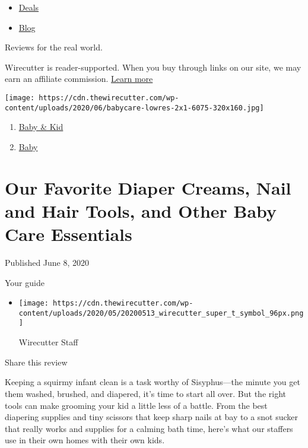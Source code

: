 \begin{itemize}
\tightlist
\item
  \href{/wirecutter/deals/}{Deals}
\item
  \href{/wirecutter/blog/}{Blog}
\end{itemize}

Reviews for the real world.

Wirecutter is reader-supported. When you buy through links on our site,
we may earn an affiliate commission. \href{/wirecutter/about/}{Learn
more}

\texttt{[image: https://cdn.thewirecutter.com/wp-content/uploads/2020/06/babycare-lowres-2x1-6075-320x160.jpg]}

\begin{enumerate}
\def\labelenumi{\arabic{enumi}.}
\tightlist
\item
  \href{/wirecutter/baby-kid/}{Baby \& Kid}
\item
  \href{/wirecutter/baby-kid/baby/}{Baby}
\end{enumerate}

\hypertarget{our-favorite-diaper-creams-nail-and-hair-tools-and-other-baby-care-essentials}{%
\section{Our Favorite Diaper Creams, Nail and Hair Tools, and Other Baby
Care
Essentials}\label{our-favorite-diaper-creams-nail-and-hair-tools-and-other-baby-care-essentials}}

Published June 8, 2020

Your guide

\begin{itemize}
\item
  \texttt{[image: https://cdn.thewirecutter.com/wp-content/uploads/2020/05/20200513\_wirecutter\_super\_t\_symbol\_96px.png]}

  Wirecutter Staff
\end{itemize}

Share this review

Keeping a squirmy infant clean is a task worthy of Sisyphus---the minute
you get them washed, brushed, and diapered, it's time to start all over.
But the right tools can make grooming your kid a little less of a
battle. From the best diapering supplies and tiny scissors that keep
sharp nails at bay to a snot sucker that really works and supplies for a
calming bath time, here's what our staffers use in their own homes with
their own kids.

